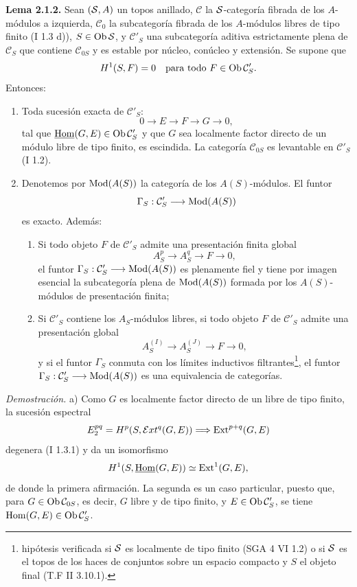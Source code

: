 \textbf{Lema 2.1.2.} Sean $(\sisi{S}{\mathcal S},A)$ un topos anillado, $\mathcal C$ la $\sisi{S}{\mathcal S}$-categoría fibrada de los $A$-módulos a izquierda, $\mathcal C_0$ la subcategoría fibrada de los $A$-módulos libres de tipo finito (I 1.3 d)), $S\in\Ob \sisi{S}{\mathcal S}$, y $\mathcal C'_S$ una subcategoría aditiva estrictamente plena de $\mathcal C_S$ que contiene $\mathcal C_{0S}$ y es estable por núcleo, conúcleo y extensión. Se supone que
\[
H^1(S,F)=0\quad\text{para todo }F\in\Ob\mathcal C'_S.
\]
Entonces:
\begin{enumerate}[label=\alph*)]
\item Toda sucesión exacta de $\mathcal C'_S$:
\[
0\longrightarrow E\longrightarrow F\longrightarrow G\longrightarrow0,
\]
tal que $\underline{\operatorname{Hom}}(G,E)
\in\Ob\mathcal C'_S$ y que $G$ sea localmente factor directo de un módulo libre de tipo finito, es escindida. La categoría $\mathcal C_{0S}$ es levantable en $\mathcal C'_S$ (I 1.2).
\item Denotemos por $\Mod(A(S))$ la categoría de los $A(S)$-módulos. El funtor
\[
\Gamma_S:\mathcal C'_S\longrightarrow\Mod(A(S))
\]
es exacto. Además:
\begin{enumerate}[label=(\roman*)]
\item Si todo objeto $F$ de $\mathcal C'_S$ admite una presentación finita global
\[
A_S^p\longrightarrow A_S^q\longrightarrow F\longrightarrow0,
\]
el funtor $\Gamma_S:\mathcal C'_S\longrightarrow\Mod(A(S))$ es plenamente fiel y tiene por imagen esencial la subcategoría plena de $\Mod(A(S))$ formada por los $A(S)$-módulos de presentación finita;
\item Si $\mathcal C'_S$ contiene los $A_S$-módulos libres, si todo objeto $F$ de $\mathcal C'_S$ admite una presentación global
\[
A_S^{(I)}\longrightarrow A_S^{(J)}\longrightarrow F\longrightarrow0,
\]
y si el funtor $\Gamma_S$ conmuta con los límites inductivos filtrantes\footnote{hipótesis verificada si $\sisi{S}{\mathcal S}$ es localmente de tipo finito (SGA 4 VI 1.2) o si $\sisi{S}{\mathcal S}$ es el topos de los haces de conjuntos sobre un espacio compacto y $S$ el objeto final (T.F II 3.10.1).}, el funtor $\Gamma_S:\mathcal C'_S\longrightarrow\Mod(A(S))$ es una equivalencia de categorías.
\end{enumerate}
\end{enumerate}

\emph{Demostración.} a) Como $G$ es localmente factor directo de un libre de tipo finito, la sucesión espectral
\[
E_2^{pq}=H^p(S,\mathcal{E}xt^q(G,E))\Longrightarrow\Ext^{\sisi{n}{p+q}}(G,E)
\]
degenera (I 1.3.1) y da un isomorfismo
\[
H^1(S,\underline{\operatorname{Hom}}(G,E))\simeq\Ext^1(G,E),
\]
de donde la primera afirmación. La segunda es un caso particular, puesto que, para $G\in\Ob\mathcal C_{0S}$, es decir, $G$ libre y de tipo finito, y $E\in\Ob\mathcal C'_S$, se tiene $\operatorname{Hom}(G,E)\in\Ob\mathcal C'_S$.

